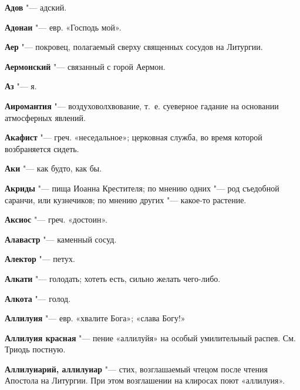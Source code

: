 \begin{mymulticols}{2}
\noindent\textbf{Адов} "--- адский. 




\noindent\textbf{Адонаи} "--- евр. «Господь мой». 




\noindent\textbf{Аер} "--- покровец, полагаемый сверху священных сосудов на Литургии. 




\noindent\textbf{Аермонский} "--- связанный с горой Аермон. 




\noindent\textbf{Аз} "--- я. 




\noindent\textbf{Аиромантия} "--- воздуховолхвование, т.~е. суеверное гадание на основании атмосферных явлений. 




\noindent\textbf{Акафист} "--- греч. «неседальное»; церковная служба, во время которой возбраняется сидеть. 




\noindent\textbf{Аки} "--- как будто, как бы. 




\noindent\textbf{Акриды} "--- пища Иоанна Крестителя; по мнению одних "--- род съедобной саранчи, или кузнечиков; по мнению других "--- какое-то растение. 




\noindent\textbf{Аксиос} "--- греч. «достоин». 




\noindent\textbf{Алавастр} "--- каменный сосуд. 




\noindent\textbf{Алектор} "--- петух. 




\noindent\textbf{Алкати} "--- голодать; хотеть есть, сильно желать чего-либо. 




\noindent\textbf{Алкота} "--- голод. 




\noindent\textbf{Аллилуия} "--- евр. «хвалите Бога»; «слава Богу!» 




\noindent\textbf{Аллилуия красная} "--- пение «аллилуйя» на особый умилительный распев. См. Триодь постную. 




\noindent\textbf{Аллилуиарий, аллилуиар} "--- стих, возглашаемый чтецом после чтения Апостола на Литургии. При этом возглашении на клиросах поют «аллилуия». 





\end{mymulticols}
